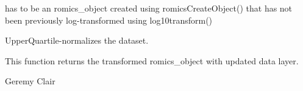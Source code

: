 \documentclass[a4paper]{book}
\begin{document}
%
\begin{Arguments}
\begin{ldescription}
\item[\code{romics\_object}] has to be an romics\_object created using romicsCreateObject() that has not been previously log-transformed using log10transform()
\end{ldescription}
\end{Arguments}
%
\begin{Details}
UpperQuartile-normalizes the dataset.
\end{Details}
%
\begin{Value}
This function returns the transformed romics\_object with updated data layer.
\end{Value}
%
\begin{Author}
Geremy Clair
\end{Author}
\printindex{}
\end{document}
